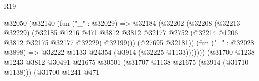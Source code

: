 \begin{lexlean}{R19}
\begin{coremodule}
                                                      @32050
                                                        (@32140
                                                          (fun ("_" : @32029) =>
                                                          @32184
                                                            (@32202
                                                              (@32208
                                                                (@32213 @32229)
                                                                (@32185
                                                                  @1216
                                                                  @471
                                                                  @3812
                                                                  @3812
                                                                  @32177
                                                                  @2752
                                                                  (@32214
                                                                    @1206
                                                                    @3812
                                                                    @32175
                                                                    @32177
                                                                    @32229)
                                                                  @32199)))
                                                            (@27695 @32181))
                                                          (fun ("_" : @32028 @3898) =>
                                                          @32222
                                                            @1133
                                                            @24354
                                                            (@3914 (@32225 @1133)))))))
                                                  (@31700
                                                    @1238
                                                    @1243
                                                    @3812
                                                    @30491
                                                    @21675
                                                    @30501
                                                    (@31707 @1138 @21675 (@3914 (@31710 @1138)))
                                                    (@31700
                                                      @1241
                                                      @471

\end{coremodule}
\end{lexlean}

